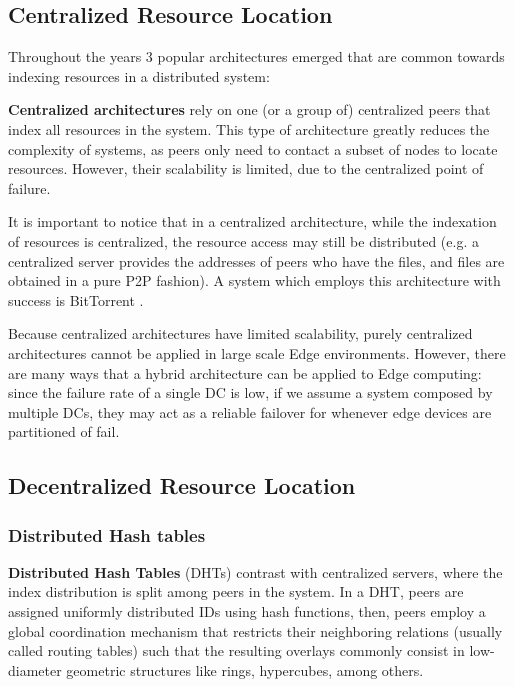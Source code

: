 \subsection{Centralized Resource Location}

Throughout the years 3 popular architectures emerged that are common towards indexing resources in a distributed system:

\textbf{Centralized architectures} rely on one (or a group of) centralized peers that index all resources in the system. This type of architecture greatly reduces the complexity of systems, as peers only need to contact a subset of nodes to locate resources. However, their scalability is limited, due to the centralized point of failure. 

It is important to notice that in a centralized architecture, while the indexation of resources is centralized, the resource access may still be distributed (e.g. a centralized server provides the addresses of peers who have the files, and files are obtained in a pure P2P fashion). A system which employs this architecture with success is BitTorrent \cite{cohen2003incentives}.

Because centralized architectures have limited scalability, purely centralized architectures cannot be applied in large scale Edge environments. However, there are many ways that a hybrid architecture can be applied to Edge computing: since the failure rate of a single DC is low, if we assume a system composed by multiple DCs, they may act as a reliable failover for whenever edge devices are partitioned of fail. 

\subsection{Decentralized Resource Location}

\subsubsection{Distributed Hash tables}

\textbf{Distributed Hash Tables} (DHTs) contrast with centralized servers, where the index distribution is split among peers in the system. In a DHT, peers are assigned uniformly distributed IDs using hash functions, then, peers employ a global coordination mechanism that restricts their neighboring relations (usually called routing tables) such that the resulting overlays commonly consist in low-diameter geometric structures like rings, hypercubes, among others. %

